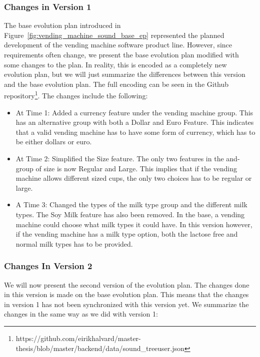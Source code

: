 \documentclass[a4paper,english]{ifimaster}
\begin{document}
\subsubsection{Changes in Version 1}%
\label{ssub:changes_in_version_1}

The base evolution plan introduced in Figure~\vref{fig:vending_machine_sound_base_ep} represented the planned development of the vending machine software product line. However, since requirements often change, we present the base evolution plan modified with some changes to the plan. In reality, this is encoded as a completely new evolution plan, but we will just summarize the differences between this version and the base evolution plan. The full encoding can be seen in the Github repository\footnote{https://github.com/eirikhalvard/master-thesis/blob/master/backend/data/sound\_treeuser.json}. The changes include the following:

\begin{itemize}
  \item At Time 1: Added a currency feature under the vending machine group. This has an alternative group with both a Dollar and Euro Feature. This indicates that a valid vending machine has to have some form of currency, which has to be either dollars or euro. 
  \item At Time 2: Simplified the Size feature. The only two features in the and-group of size is now Regular and Large. This implies that if the vending machine allows different sized cups, the only two choices has to be regular or large.
  \item A Time 3: Changed the types of the milk type group and the different milk types. The Soy Milk feature has also been removed. In the base, a vending machine could choose what milk types it could have. In this version however, if the vending machine has a milk type option, both the lactose free and normal milk types has to be provided.
\end{itemize}

\subsubsection{Changes In Version 2}%
\label{ssub:changes_in_version_2}

We will now present the second version of the evolution plan. The changes done in this version is made on the base evolution plan. This means that the changes in version 1 has not been synchronized with this version yet. We summarize the changes in the same way as we did with version 1:
\end{document}
